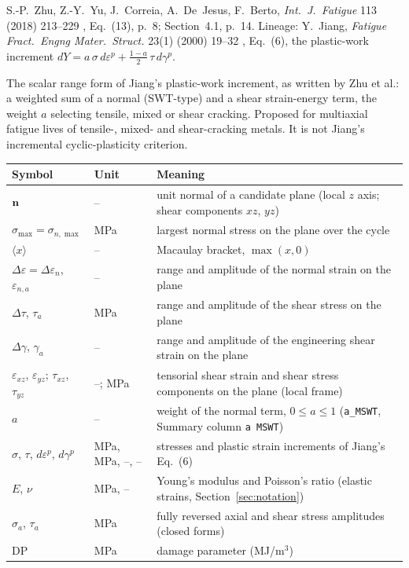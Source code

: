 \label{sheet:MSWT}

 S.-P.~Zhu, Z.-Y.~Yu, J.~Correia, A.~De~Jesus, F.~Berto, \emph{Int.\ J.\ Fatigue} 113
(2018) 213--229 \cite{zhu2018}, Eq.~(13), p.~8; Section~4.1, p.~14. Lineage: Y.~Jiang,
\emph{Fatigue Fract.\ Engng Mater.\ Struct.} 23(1) (2000) 19--32 \cite{jiang2000}, Eq.~(6), the
plastic-work increment $dY = a\,\sigma\,d\varepsilon^p + \tfrac{1-a}{2}\,\tau\,d\gamma^p$.

 The scalar range form of Jiang's plastic-work increment, as written by Zhu et
al.: a weighted sum of a normal (SWT-type) and a shear strain-energy term, the weight $a$ selecting
tensile, mixed or shear cracking. Proposed for multiaxial fatigue lives of tensile-, mixed- and
shear-cracking metals. It is not Jiang's incremental cyclic-plasticity criterion.

\begin{center}\small
\begin{tabular}{@{}llp{100mm}@{}}
\toprule
Symbol & Unit & Meaning\\\midrule
$\mathbf n$ & -- & unit normal of a candidate plane (local $z$ axis; shear components $xz$, $yz$)\\
$\sigma_{\max}=\sigma_{n,\max}$ & MPa & largest normal stress on the plane over the cycle\\
$\langle x\rangle$ & -- & Macaulay bracket, $\max(x,0)$\\
$\Delta\varepsilon=\Delta\varepsilon_n$, $\varepsilon_{n,a}$ & -- & range and amplitude of the normal strain on the plane\\
$\Delta\tau$, $\tau_a$ & MPa & range and amplitude of the shear stress on the plane\\
$\Delta\gamma$, $\gamma_a$ & -- & range and amplitude of the engineering shear strain on the plane\\
$\varepsilon_{xz}$, $\varepsilon_{yz}$; $\tau_{xz}$, $\tau_{yz}$ & --; MPa & tensorial shear strain and shear stress components on the plane (local frame)\\
$a$ & -- & weight of the normal term, $0\le a\le1$ (\texttt{a\_MSWT}, Summary column \texttt{a MSWT})\\
$\sigma$, $\tau$, $d\varepsilon^p$, $d\gamma^p$ & MPa, MPa, --, -- & stresses and plastic strain increments of Jiang's Eq.~(6)\\
$E$, $\nu$ & MPa, -- & Young's modulus and Poisson's ratio (elastic strains, Section~\ref{sec:notation})\\
$\sigma_a$, $\tau_a$ & MPa & fully reversed axial and shear stress amplitudes (closed forms)\\
$\mathrm{DP}$ & MPa & damage parameter (MJ/m$^3$)\\
\bottomrule
\end{tabular}
\end{center}

